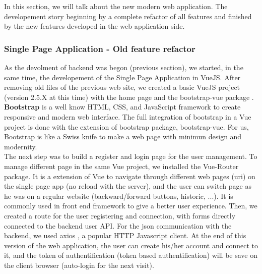 \documentclass{eplmastersthesis}
\begin{document}
        In this section, we will talk about the new modern web application.
        The developement story beginning by a complete refactor of all features
        and finished by the new features developed in the web application side.

        \subsubsection{Single Page Application - Old feature refactor}
        As the devolment of backend was begon (previous section), we started, in the same time, the
        developement of the Single Page Application in VueJS. After removing
        old files of the previous web site, we created a basic VueJS project
        (version 2.5.X at this time) with the home page and the bootstrap-vue
        package \cite{BootstrapVue}. \textbf{Bootstrap} \cite{Bootstrap} is a
        well know HTML, CSS, and JavaScript framework to create responsive and
        modern web interface. The full integration of bootstrap in a Vue
        project is done with the extension of bootstrap package, bootstrap-vue.
        For us, Bootstrap is like a Swiss knife to make a web page with minimun
        design and modernity. \\

        The next step was to build a register and login page for the user
        management. To manage different page in the same Vue project, we
        installed the Vue-Router package. It is a extension of Vue to navigate
        through different web pages (uri) on the single page app (no reload with
        the server), and the user can switch page as he was on a regular
        website (backward/forward buttons, historic, ...). It is commonly used in
        front end framework to give a better user experience. Then, we created
        a route for the user registering and connection, with forms directly connected to
        the backend user API. For the json communication with the backend, we
        used axios \cite{axios}, a popular HTTP Javascript client. At the end
        of this version of the web application, the user can create his/her
        account and connect to it, and the token of authentification (token
        based authentification) will be save on the client browser (auto-login
        for the next visit). \\
\end{document}

